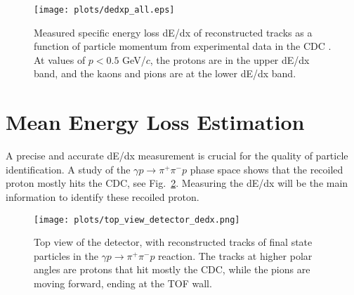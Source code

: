\begin{figure}[H]
    \centering
    \texttt{[image: plots/dedxp\_all.eps]}
    \caption{\label{fig.3.1}Measured specific energy loss dE/dx of reconstructed tracks as a function of particle momentum from experimental data in the CDC . At values of $p<0.5$ GeV/$c$, the protons are in the upper dE/dx band, and the kaons and pions are at the lower dE/dx band.}
\end{figure}

\section{Mean Energy Loss Estimation}
\label{p.3.2}

A precise and accurate dE/dx measurement is crucial for the quality of particle identification. A study of the $\gamma p \rightarrow \pi^{+} \pi^{-} p$ phase space shows that the recoiled proton mostly hits the CDC, see Fig.~\ref{fig.3.2}.
Measuring the dE/dx will be the main information to identify these recoiled proton.

\begin{figure}[H]
    \centering
    \texttt{[image: plots/top\_view\_detector\_dedx.png]}
    \caption{\label{fig.3.2}Top view of the detector, with reconstructed tracks of final state particles in the $\gamma p \rightarrow \pi^{+} \pi^{-} p$ reaction. The tracks at higher polar angles are protons that hit mostly the CDC, while the pions are moving forward, ending at the TOF wall.}
\end{figure}

